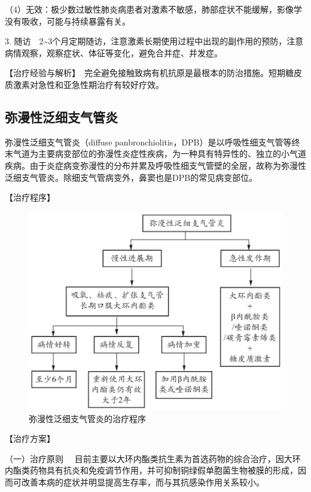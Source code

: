 （4）无效：极少数过敏性肺炎病患者对激素不敏感，肺部症状不能缓解，影像学没有吸收，可能与持续暴露有关。

3.
随访　2\textasciitilde{}3个月定期随访，注意激素长期使用过程中出现的副作用的预防，注意病情观察，观察症状、体征等变化，避免合并症、并发症。

【治疗经验与解析】　完全避免接触致病有机抗原是最根本的防治措施。短期糖皮质激素对急性和亚急性期治疗有较好疗效。

\subsection{弥漫性泛细支气管炎}

弥漫性泛细支气管炎（diffuse
panbronchiolitis，DPB）是以呼吸性细支气管等终末气道为主要病变部位的弥漫性炎症性疾病，为一种具有特异性的、独立的小气道疾病。由于炎症病变弥漫性的分布并累及呼吸性细支气管壁的全层，故称为弥漫性泛细支气管炎。除细支气管病变外，鼻窦也是DPB的常见病变部位。

【治疗程序】

\begin{figure}[!htbp]
 \centering
 \includegraphics{./images/Image00033.jpg}
 \captionsetup{justification=centering}
 \caption{弥漫性泛细支气管炎的治疗程序}
 \label{fig1-14-5}
  \end{figure} 

【治疗方案】

{（一）治疗原则}
　目前主要以大环内酯类抗生素为首选药物的综合治疗，因大环内酯类药物具有抗炎和免疫调节作用，并可抑制铜绿假单胞菌生物被膜的形成，因而可改善本病的症状并明显提高生存率，而与其抗感染作用关系较小。

